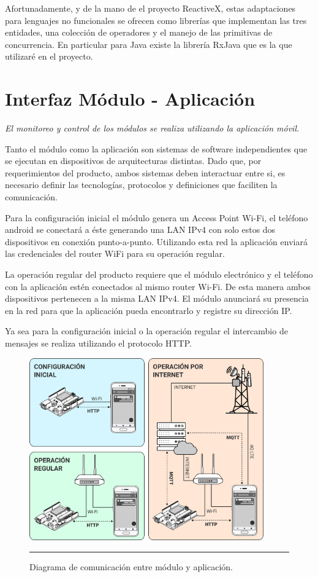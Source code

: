 Afortunadamente, y de la mano de el proyecto ReactiveX, estas adaptaciones para lenguajes no funcionales se ofrecen como librerías que implementan las tres entidades, una colección de operadores y el manejo de las primitivas de concurrencia. En particular para Java existe la librería RxJava que es la que utilizaré en el proyecto.



\section{Interfaz Módulo - Aplicación}
\label{section:interfaces}
\emph{El monitoreo y control de los módulos se realiza utilizando la aplicación móvil.}

Tanto el módulo como la aplicación son sistemas de software independientes que se ejecutan en dispositivos de arquitecturas distintas. Dado que, por requerimientos del producto, ambos sistemas deben interactuar entre si, es necesario definir las tecnologías, protocolos y definiciones que faciliten la comunicación.

Para la configuración inicial el módulo genera un Access Point Wi-Fi, el teléfono android se conectará a éste generando una LAN IPv4 con solo estos dos dispositivos en conexión punto-a-punto. Utilizando esta red la aplicación enviará las credenciales del router WiFi para su operación regular.

La operación regular del producto requiere que el módulo electrónico y el teléfono con la aplicación estén conectados al mismo router Wi-Fi. De esta manera ambos dispositivos pertenecen a la misma LAN IPv4. El módulo anunciará su presencia en la red para que la aplicación pueda encontrarlo y registre su dirección IP.

Ya sea para la configuración inicial o la operación regular el intercambio de mensajes se realiza utilizando el protocolo HTTP.

\begin{figure}[htbp]
	\centering
	\includegraphics[width=0.9\textwidth]{Figures/design/conect.png}
	\rule{35em}{1pt}
	\caption[Esquema conexión Modulo-App]{Diagrama de comunicación entre módulo y aplicación.}
	\label{fig:comunic_mod_app}
\end{figure}

